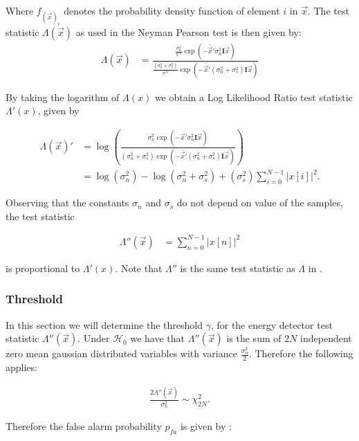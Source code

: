 \documentclass[a4paper, openany, oneside]{memoir}
\begin{document}
Where $f_{(\vec{x})_i}$ denotes the probability density function of element $i$ in $\vec{x}$.  The test statistic $\Lambda(\vec{x})$ as used in the Neyman Pearson test is then given by:
\begin{align*}
\Lambda(\vec{x}) &=\frac{\frac{\sigma_n^2}{\pi^N } \exp(-\bar{\vec{x}}'\sigma_n^2\mathbf{I}\vec{x})}{\frac{(\sigma_n^2 + \sigma_s^2)}{\pi^N } \exp(-\bar{\vec{x}}'(\sigma_n^2+\sigma_s^2)\mathbf{I}\vec{x})}
\end{align*}


By taking the logarithm of $\Lambda(x)$ we obtain a Log Likelihood Ratio test statistic $\Lambda'(x)$, given by

\begin{align*}
\Lambda(\vec{x})' &= \log \left(
\frac{\sigma_n^2\exp(-\overline{\vec{x}}'\sigma_n^2\mathbf{I}\vec{x})}{(\sigma_n^2 + \sigma_s^2)\exp(-\bar{\vec{x}}'(\sigma_n^2+\sigma_s^2)\mathbf{I}\vec{x})}\right) \\
&= \log\left(\sigma_n^2\right) - \log\left(\sigma_n^2 + \sigma_s^2\right) +  (\sigma_s^2) \sum_{i=0}^{N-1} |x[i]|^2. 
\end{align*}

Observing that the constants $\sigma_n$ and $\sigma_s$ do not depend on value of the samples, the test statistic 

\begin{align*}
\Lambda''(\vec{x}) &= \sum_{n=0}^{N-1} |x[n]|^2
\end{align*} 

is proportional to $\Lambda'(x)$. Note that $\Lambda''$ is the same test statistic as $\Lambda$ in .

\subsubsection{Threshold}
In this section we will determine the threshold $\gamma$, for the energy detector test statistic $\Lambda''(\vec{x})$.
Under $\mathcal{H}_0$ we have that $\Lambda''(\vec{x})$ is the sum of $2N$ independent zero mean gaussian distributed variables
with variance $\frac{\sigma_n^2}{2}$. Therefore the following applies:

\begin{align}
    \frac{2\Lambda''(\vec{x})}{\sigma_n^2} \sim \chi^2_{2N}.
\end{align}

Therefore the false alarm probability $p_{fa}$ is given by \cite{rugini2013small}:
\end{document}
